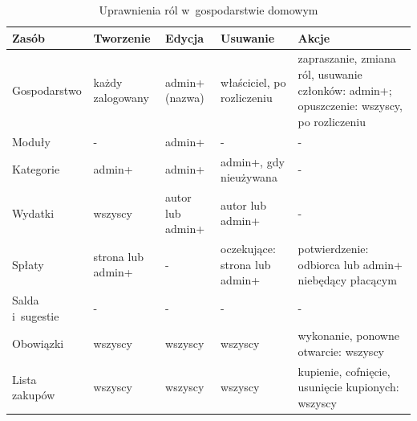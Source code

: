 \begin{table}[H]
  \centering
  \caption{Uprawnienia ról w~gospodarstwie domowym}
  \label{tab:uprawnienia}
  \begin{tabularx}{\textwidth}{@{}>{\raggedright\arraybackslash}p{}>{\raggedright\arraybackslash}p{}>{\raggedright\arraybackslash}p{}>{\raggedright\arraybackslash}p{}L@{}}
    \toprule
    Zasób & Tworzenie & Edycja & Usuwanie & Akcje \\
    \midrule
    Gospodarstwo & każdy zalogowany & admin+ (nazwa) & właściciel, po rozliczeniu & zapraszanie, zmiana ról, usuwanie członków: admin+; opuszczenie: wszyscy, po rozliczeniu \\
    Moduły & - & admin+ & - & - \\
    Kategorie & admin+ & admin+ & admin+, gdy nieużywana & - \\
    Wydatki & wszyscy & autor lub admin+ & autor lub admin+ & - \\
    Spłaty & strona lub admin+ & - & oczekujące: strona lub admin+ & potwierdzenie: odbiorca lub admin+ niebędący płacącym \\
    Salda i~sugestie & - & - & - & - \\
    Obowiązki & wszyscy & wszyscy & wszyscy & wykonanie, ponowne otwarcie: wszyscy \\
    Lista zakupów & wszyscy & wszyscy & wszyscy & kupienie, cofnięcie, usunięcie kupionych: wszyscy \\
    \bottomrule
  \end{tabularx}
\end{table}
